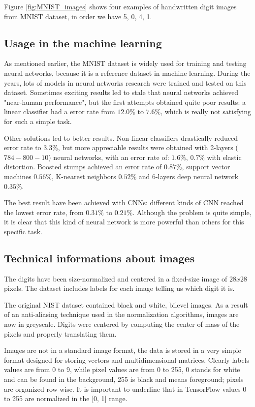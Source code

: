 Figure \ref{fig:MNIST_images} shows four examples of handwritten digit images from MNIST dataset, in order we have 5, 0, 4, 1.

\subsection{Usage in the machine learning}

As mentioned earlier, the MNIST dataset is widely used for training and testing neural networks, because it is a reference dataset in machine learning. During the years, lots of models in neural networks research were trained and tested on this dataset. Sometimes exciting results led to stale that neural networks achieved "near-human performance", but the first attempts obtained quite poor results: a linear classifier had a error rate from $12.0 \%$ to $7.6 \%$, which is really not satisfying for such a simple task.

Other solutions led to better results. Non-linear classifiers drastically reduced error rate to $3.3 \%$, but more appreciable results were obtained with 2-layers ($784-800-10$) neural networks, with an error rate of: $1.6 \%$, $0.7 \%$ with elastic distortion. Boosted stumps achieved an error rate of $0.87 \%$, support vector machines $0.56 \%$, K-nearest neighbors $0.52 \%$ and 6-layers deep neural network $0.35 \%$.

The best result have been achieved with \acsp{CNN}: different kinds of \acs{CNN} reached the lowest error rate, from $0.31 \%$ to $0.21 \%$. Although the problem is quite simple, it is clear that this kind of neural network is more powerful than others for this specific task.

\subsection{Technical informations about images}

The digits have been size-normalized and centered in a fixed-size image of $28x28$ pixels. The dataset includes labels for each image telling us which digit it is.

The original NIST dataset contained black and white, bilevel images. As a result of an anti-aliasing technique used in the normalization algorithms, images are now in greyscale. Digits were centered by computing the center of mass of the pixels and properly translating them.

Images are not in a standard image format, the data is stored in a very simple format designed for storing vectors and multidimensional matrices. Clearly labels values are from 0 to 9, while pixel values are from 0 to 255, 0 stands for white and can be found in the background, 255 is black and means foreground; pixels are organized row-wise. It is important to underline that in TensorFlow values 0 to 255 are normalized in the [0, 1] range.

